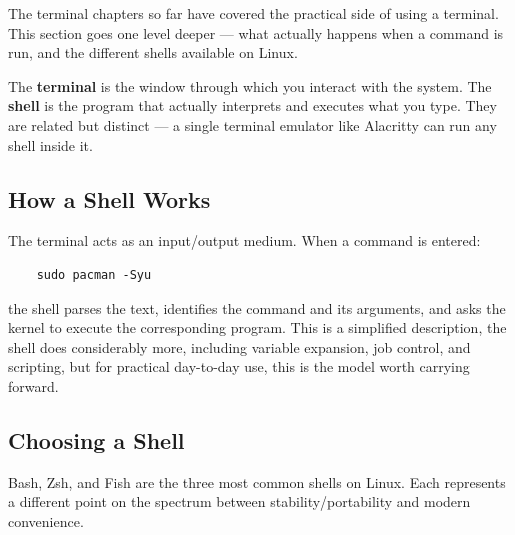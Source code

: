 \documentclass{article}
\begin{document}
The terminal chapters so far have covered the practical side of using a terminal.
This section goes one level deeper --- what actually happens when a command is
run, and the different shells available on Linux.

\begin{tcolorbox}[arc=12pt, outer arc=10pt,
	colback=blue!4!white, colframe=blue!40!black,
	title=\textbf{Terminal vs.\ Shell, Revisited}]
	The \textbf{terminal} is the window through which you interact with the system.
	The \textbf{shell} is the program that actually interprets and executes what
	you type. They are related but distinct --- a single terminal emulator like
	Alacritty can run any shell inside it.
\end{tcolorbox}

\subsection{How a Shell Works}

The terminal acts as an input/output medium. When a command is entered:

\begin{verbatim}
	sudo pacman -Syu
\end{verbatim}

\noindent the shell parses the text, identifies the command and its arguments, and
asks the kernel to execute the corresponding program. This is a simplified
description, the shell does considerably more, including variable expansion,
job control, and scripting, but for practical day-to-day use, this is the
model worth carrying forward.

\subsection{Choosing a Shell}

Bash, Zsh, and Fish are the three most common shells on Linux. Each represents a
different point on the spectrum between stability/portability and modern
convenience.

\vspace{1em}
\end{document}

